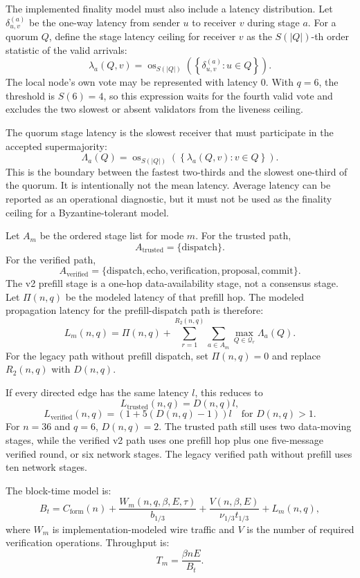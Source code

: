 The implemented finality model must also include a latency distribution. Let
\(\delta_{u,v}^{(a)}\) be the one-way latency from sender \(u\) to receiver
\(v\) during stage \(a\). For a quorum \(Q\), define the stage latency ceiling
for receiver \(v\) as the \(S(|Q|)\)-th order statistic of the valid arrivals:
\[
\lambda_{a}(Q,v)
=
\operatorname{os}_{S(|Q|)}
\left(
\left\{
\delta_{u,v}^{(a)} : u \in Q
\right\}
\right).
\]
The local node's own vote may be represented with latency \(0\). With
\(q=6\), the threshold is \(S(6)=4\), so this expression waits for the fourth
valid vote and excludes the two slowest or absent validators from the liveness
ceiling.

The quorum stage latency is the slowest receiver that must participate in the
accepted supermajority:
\[
\Lambda_a(Q)
=
\operatorname{os}_{S(|Q|)}
\left(
\left\{
\lambda_a(Q,v) : v \in Q
\right\}
\right).
\]
This is the boundary between the fastest two-thirds and the slowest one-third
of the quorum. It is intentionally not the mean latency. Average latency can be
reported as an operational diagnostic, but it must not be used as the finality
ceiling for a Byzantine-tolerant model.

Let \(A_m\) be the ordered stage list for mode \(m\). For the trusted path,
\[
A_{\mathrm{trusted}}=\{\mathrm{dispatch}\}.
\]
For the verified path,
\[
A_{\mathrm{verified}}
=
\{\mathrm{dispatch},\mathrm{echo},\mathrm{verification},
\mathrm{proposal},\mathrm{commit}\}.
\]
The v2 prefill stage is a one-hop data-availability stage, not a consensus
stage. Let \(\Pi(n,q)\) be the modeled latency of that prefill hop. The modeled
propagation latency for the prefill-dispatch path is therefore:
\[
L_m(n,q)
=
\Pi(n,q)+
\sum_{r=1}^{R_2(n,q)}
\sum_{a \in A_m}
\max_{Q \in \mathcal{Q}_r}
\Lambda_a(Q).
\]
For the legacy path without prefill dispatch, set \(\Pi(n,q)=0\) and replace
\(R_2(n,q)\) with \(D(n,q)\).

If every directed edge has the same latency \(l\), this reduces to
\[
L_{\mathrm{trusted}}(n,q)=D(n,q)l,
\]
\[
L_{\mathrm{verified}}(n,q)=\left(1+5(D(n,q)-1)\right)l
\quad\text{for }D(n,q)>1.
\]
For \(n=36\) and \(q=6\), \(D(n,q)=2\). The trusted path still uses two
data-moving stages, while the verified v2 path uses one prefill hop plus one
five-message verified round, or six network stages. The legacy verified path
without prefill uses ten network stages.

The block-time model is:
\[
B_t =
C_{\mathrm{form}}(n)
+
\frac{W_m(n,q,\beta,E,\tau)}{b_{1/3}}
+
\frac{V(n,\beta,E)}{\nu_{1/3}t_{1/3}}
+
L_m(n,q),
\]
where \(W_m\) is implementation-modeled wire traffic and \(V\) is the number
of required verification operations. Throughput is:
\[
T_m=\frac{\beta n E}{B_t}.
\]

